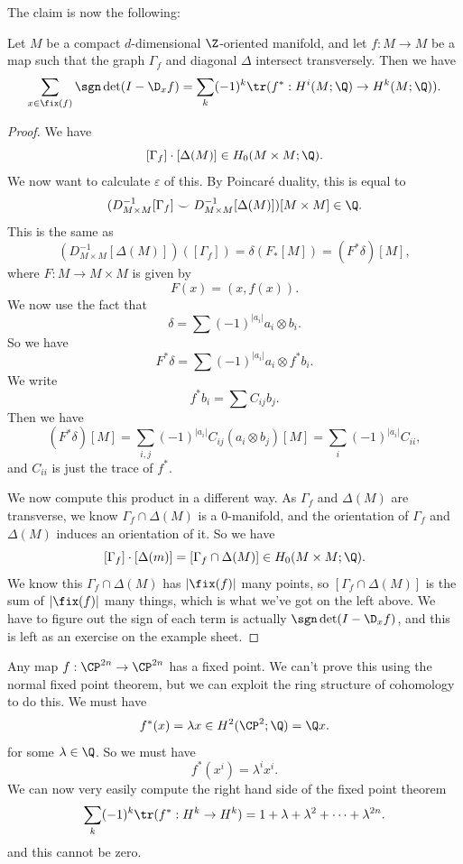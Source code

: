\documentclass[a4paper]{article}
\theoremstyle{definition}
\begin{document}
The claim is now the following:
\begin{thm}
  Let $M$ be a compact $d$-dimensional $\Z$-oriented manifold, and let $f: M \to M$ be a map such that the graph $\Gamma_f$ and diagonal $\Delta$ intersect transversely.
  Then we have
  \[
    \sum_{x \in \fix(f)} \sgn \det(I - \D_x f) = \sum_k (-1)^k \tr(f^*: H^i(M; \Q) \to H^k(M; \Q)).
  \]
\end{thm}
\begin{proof}
  We have
  \[
    [\Gamma_f] \cdot [\Delta (M)] \in H_0(M \times M; \Q).
  \]
  We now want to calculate $\varepsilon$ of this. By Poincar\'e duality, this is equal to
  \[
    (D_{M \times M}^{-1}[\Gamma_f] \smile D_{M \times M}^{-1}[\Delta(M)])[M \times M] \in \Q.
  \]
  This is the same as
  \[
    (D_{M \times M}^{-1} [\Delta(M)]) ([\Gamma_f]) = \delta(F_*[M]) = (F^* \delta)[M],
  \]
  where $F: M \to M \times M$ is given by
  \[
    F(x) = (x, f(x)).
  \]
  We now use the fact that
  \[
    \delta = \sum (-1)^{|a_i|} a_i \otimes b_i.
  \]
  So we have
  \[
    F^* \delta = \sum (-1)^{|a_i|} a_i \otimes f^* b_i.
  \]
  We write
  \[
    f^* b_i = \sum C_{ij} b_j.
  \]
  Then we have
  \[
    (F^* \delta)[M] = \sum_{i, j} (-1)^{|a_i|} C_{ij} (a_i \otimes b_j) [M] = \sum_i (-1)^{|a_i|} C_{ii},
  \]
  and $C_{ii}$ is just the trace of $f^*$.

  We now compute this product in a different way. As $\Gamma_f$ and $\Delta (M)$ are transverse, we know $\Gamma_f \cap \Delta(M)$ is a $0$-manifold, and the orientation of $\Gamma_f$ and $\Delta(M)$ induces an orientation of it. So we have
  \[
    [\Gamma_f] \cdot [\Delta(m)] = [\Gamma_f \cap \Delta(M)] \in H_0(M \times M; \Q).
  \]
  We know this $\Gamma_f \cap \Delta(M)$ has $|\fix(f)|$ many points, so $[\Gamma_f \cap \Delta(M)]$ is the sum of $|\fix(f)|$ many things, which is what we've got on the left above. We have to figure out the sign of each term is actually $\sgn \det(I - \D_x f)$, and this is left as an exercise on the example sheet.
\end{proof}

\begin{eg}
  Any map $f: \CP^{2n} \to \CP^{2n}$ has a fixed point. We can't prove this using the normal fixed point theorem, but we can exploit the ring structure of cohomology to do this. We must have
  \[
    f^*(x) = \lambda x \in H^2(\CP^2; \Q) = \Q x.
  \]
  for some $\lambda \in \Q$. So we must have
  \[
    f^*(x^i) = \lambda^i x^i.
  \]
  We can now very easily compute the right hand side of the fixed point theorem
  \[
    \sum_k (-1)^k \tr(f^*: H^k \to H^k) = 1 + \lambda + \lambda^2 + \cdots + \lambda^{2n}.
  \]
  and this cannot be zero.
\end{eg}

\printindex
\end{document}
